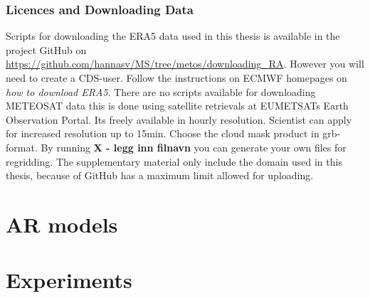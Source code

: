 \subsubsection{Licences and Downloading Data} \label{sec:downloading_data}
Scripts for downloading the ERA5 data used in this thesis is available in the project GitHub on \href{https://github.com/hannasv/MS/tree/metos/downloading{\_}RA}{https://github.com/hannasv/MS/tree/metos/downloading{\_}RA}. However you will need to create a CDS-user. Follow the instructions on ECMWF homepages on \textit{how to download ERA5}. There are no scripts available for downloading METEOSAT data this is done using satellite retrievals at EUMETSATs Earth Observation Portal. Its freely available in hourly resolution. Scientist can apply for increased resolution up to 15min. Choose the cloud mask product in grb-format. By running \textbf{X - legg inn filnavn} you can generate your own files for regridding. The supplementary material only include the domain used in this thesis, because of GitHub has a maximum limit allowed for uploading. 

\section{AR models}

\section{Experiments}






